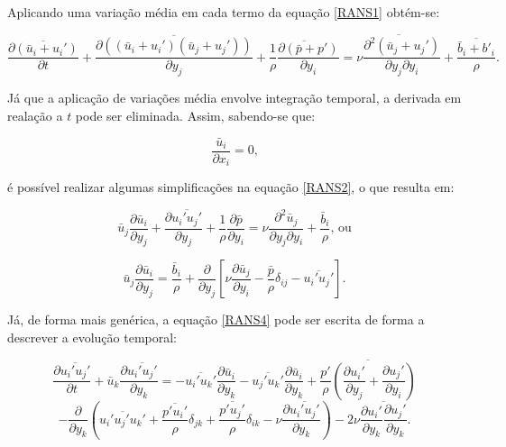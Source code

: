 \documentclass[_ArquivoPrincipal.tex]{subfiles}
\begin{document}
Aplicando uma variação média em cada termo da equação \ref{RANS1} obtém-se:

\begin{equation}
    \overline{\frac{\partial(\bar{u}_i+u_i')}{\partial t}}+\overline{\frac{\partial((\bar{u}_i+u_i')(\bar{u}_j+u_j'))}{\partial y_j}}+\overline{\frac{1}{\rho}\frac{\partial(\bar{p}+p')}{\partial y_i}}=\overline{\nu\frac{\partial^2(\bar{u}_j+u_j')}{\partial y_j\partial y_i}}+\overline{\frac{\bar{b}_i+b'_i}{\rho}}\text{.}
    \label{RANS2}
\end{equation}

Já que a aplicação de variações média envolve integração temporal, a derivada em realação a $t$ pode ser eliminada. Assim, sabendo-se que:

\begin{equation}
    \frac{\bar{u}_i}{\partial x_i}=0\text{,}
    \label{dudxi}
\end{equation}

\noindent é possível realizar algumas simplificações na equação \ref{RANS2}, o que resulta em:

\begin{equation}
    \bar{u}_j\frac{\partial\bar{u}_i}{\partial y_j}+\frac{\partial\overline{u_i'u_j'}}{\partial y_j}+\frac{1}{\rho}\frac{\partial\bar{p}}{\partial y_i}=\nu\frac{\partial^2\bar{u}_j}{\partial y_j\partial y_i}+\frac{\bar{b}_i}{\rho}\text{, ou}
    \label{RANS3}
\end{equation}

\begin{equation}
    \bar{u}_j\frac{\partial\bar{u}_i}{\partial y_j}=\frac{\bar{b}_i}{\rho}+\frac{\partial}{\partial y_j}\left[\nu\frac{\partial\bar{u}_j}{\partial y_i}-\frac{\bar{p}}{\rho}\delta_{ij}-\overline{u_i'u_j'}\right]\text{.}
    \label{RANS4}
\end{equation}

Já, de forma mais genérica, a equação \ref{RANS4} pode ser escrita de forma a descrever a evolução temporal:

\[
    \frac{\partial\overline{u_i'u_j'}}{\partial t}
    +\bar{u}_k\frac{\partial{\overline{u_i'u_j'}}}{\partial y_k}
    =-\overline{u_i'u_k'}\frac{\partial\bar{u}_i}{\partial y_k}
    -\overline{u_j'u_k'}\frac{\partial\bar{u}_i}{\partial y_k}
    +\overline{\frac{p'}{\rho}\left(\frac{\partial u_i'}{\partial y_j}+\frac{\partial u_j'}{\partial y_i}\right)}
    \]
\begin{equation}
    -\frac{\partial}{\partial y_k}\left(\overline{u_i'u_j'u_k'}+\frac{\overline{p'u_i'}}{\rho}\delta_{jk}+\frac{\overline{p'u_j'}}{\rho}\delta_{ik}-\nu\frac{\partial\overline{u_i'u_j'}}{\partial y_k}\right)
    -2\nu\overline{\frac{\partial u_i'}{\partial y_k}\frac{\partial u_j'}{\partial y_k}}
    \text{.}
    \label{RANS5}
\end{equation}
\end{document}
